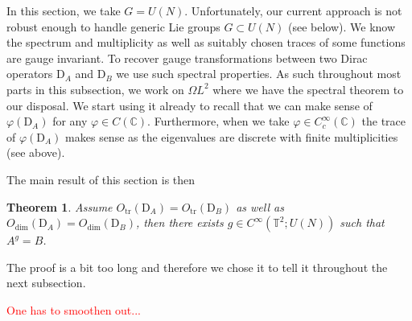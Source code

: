 \documentclass[12pt]{article}
\numberwithin{equation}{section}
\newtheorem{theorem}{Theorem}[section]
\theoremstyle{definition}
\theoremstyle{remark}
\newcommand{\1}{\mathbf 1}
\newcommand{\<}{\langle}
\renewcommand{\>}{\rangle}
\newcommand{\tr}{\operatorname{tr}}
\newcommand{\red}[1]{\textcolor{red}{#1}}
\newcommand{\rmD}{\mathrm{D}}
\newcommand{\bC}{\mathbb C}
\newcommand{\bT}{\mathbb T}
\begin{document}
In this section, we take $G=U(N)$. Unfortunately, our current approach is not robust enough to handle generic Lie groups $G\subset U(N)$ (see  below). We know the spectrum and multiplicity as well as suitably chosen traces of some functions are gauge invariant. To recover gauge transformations between two Dirac operators $\rmD_A$ and $\rmD_B$ we use such spectral properties. As such throughout most parts in this subsection, we work on $\Omega L^2$ where we have the spectral theorem to our disposal. We start using it already to recall that we can make sense of $\varphi(\rmD_A)$ for any $\varphi\in C(\bC)$. Furthermore, when we take $\varphi\in C^\infty_c(\bC)$ the trace of $\varphi(\rmD_A)$ makes sense as the eigenvalues are discrete with finite multiplicities (see  above). 


The main result of this section is then 
\begin{theorem}\label{thm:recover_gauge_smooth}
    Assume $O_{\tr}(\rmD_A)=O_{\tr}(\rmD_B)$ as well as $O_{\dim}(\rmD_A)=O_{\dim}(\rmD_B)$, then there exists $g\in C^\infty(\bT^2;U(N))$ such that $A^g=B$. 
\end{theorem}
The proof is a bit too long and therefore we chose it to tell it throughout the next subsection.

\red{One has to smoothen out...}





\end{document}
